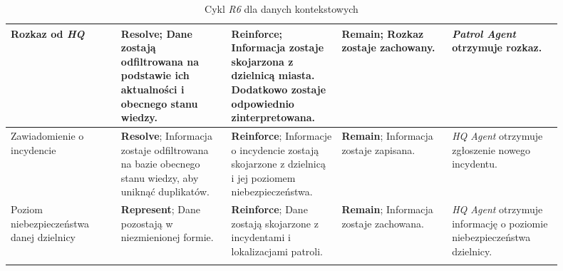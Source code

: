 \begin{landscape}
\begin{longtable}{|p{0.18\linewidth}|p{0.18\linewidth}|p{0.18\linewidth}|p{0.18\linewidth}|p{0.18\linewidth}|}
     \hline
     Rozkaz od \emph{HQ}  & \textbf{Resolve}; Dane zostają odfiltrowana na podstawie ich aktualności i obecnego stanu wiedzy. & \textbf{Reinforce}; Informacja zostaje skojarzona z dzielnicą miasta. Dodatkowo zostaje odpowiednio zinterpretowana. & \textbf{Remain}; Rozkaz zostaje zachowany. & \emph{Patrol Agent} otrzymuje rozkaz. \\
     \hline
     Zawiadomienie o incydencie  & \textbf{Resolve}; Informacja zostaje odfiltrowana na bazie obecnego stanu wiedzy, aby uniknąć duplikatów. & \textbf{Reinforce}; Informacje o incydencie zostają skojarzone z dzielnicą i jej poziomem niebezpieczeństwa. & \textbf{Remain}; Informacja zostaje zapisana. & \emph{HQ Agent} otrzymuje zgłoszenie nowego incydentu. \\
     \hline
      Poziom niebezpieczeństwa danej dzielnicy &  \textbf{Represent}; Dane pozostają w niezmienionej formie. & \textbf{Reinforce}; Dane zostają skojarzone z incydentami i lokalizacjami patroli. & \textbf{Remain}; Informacja zostaje zachowana. & \emph{HQ Agent} otrzymuje informację o poziomie niebezpieczeństwa dzielnicy. \\
      \hline
    \caption{Cykl \emph{R6} dla danych kontekstowych}
    \label{tab:r6CycleForContextData}
    \end{longtable}
\end{landscape}


